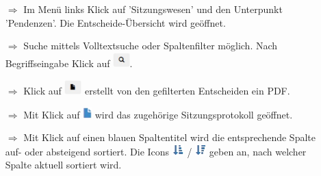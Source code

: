 \documentclass{article}
\begin{document}
\begin{multicols}{2}

\begin{tcolorbox}[colback=blue!5,colframe=blue!40!black,title=Entscheide in der Übersicht]
\begin{itemize}
  \item[$\Longrightarrow$] Im Menü links Klick auf 'Sitzungswesen' und den Unterpunkt 'Pendenzen'. Die Entscheide-Übersicht wird geöffnet.
  \item[$\Longrightarrow$] Suche mittels Volltextsuche oder Spaltenfilter möglich. Nach Begriffseingabe Klick auf \includegraphics[height=16pt]{Icons/Lupe_s.png}.
  \item[$\Longrightarrow$] Klick auf \includegraphics[height=16pt]{Icons/Blattsymbol_s.png} erstellt von den gefilterten Entscheiden ein PDF.
  \item[$\Longrightarrow$] Mit Klick auf \includegraphics[height=12pt]{Icons/Blattsymbol.png} wird das zugehörige Sitzungsprotokoll geöffnet.
	\item[$\Longrightarrow$] Mit Klick auf einen blauen Spaltentitel wird die entsprechende Spalte auf- oder absteigend sortiert. Die Icons \includegraphics[height=12pt]{Icons/sort_down.png} / \includegraphics[height=12pt]{Icons/sort_up.png} geben an, nach welcher Spalte aktuell sortiert wird.
\end{itemize}
\end{tcolorbox}



\end{multicols}
\end{document}
